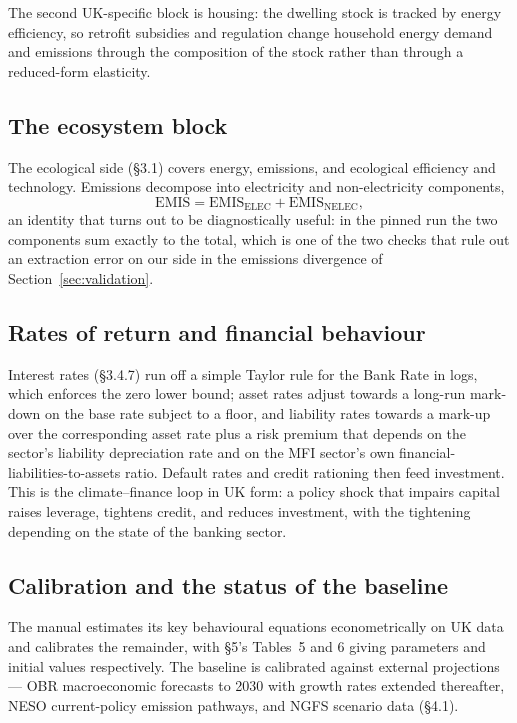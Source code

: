 The second UK-specific block is housing: the dwelling stock is tracked by energy efficiency, so retrofit subsidies and regulation change household energy demand and emissions through the composition of the stock rather than through a reduced-form elasticity.

\subsection{The ecosystem block}

The ecological side (\S3.1) covers energy, emissions, and ecological efficiency and technology. Emissions decompose into electricity and non-electricity components,
\begin{equation}
\mathrm{EMIS} = \mathrm{EMIS}_{\mathrm{ELEC}} + \mathrm{EMIS}_{\mathrm{NELEC}},
\label{eq:emis}
\end{equation}
an identity that turns out to be diagnostically useful: in the pinned run the two components sum exactly to the total, which is one of the two checks that rule out an extraction error on our side in the emissions divergence of Section~\ref{sec:validation}.

\subsection{Rates of return and financial behaviour}

Interest rates (\S3.4.7) run off a simple Taylor rule for the Bank Rate in logs, which enforces the zero lower bound; asset rates adjust towards a long-run mark-down on the base rate subject to a floor, and liability rates towards a mark-up over the corresponding asset rate plus a risk premium that depends on the sector's liability depreciation rate and on the MFI sector's own financial-liabilities-to-assets ratio. Default rates and credit rationing then feed investment. This is the \citet{dafermos2018} climate--finance loop in UK form: a policy shock that impairs capital raises leverage, tightens credit, and reduces investment, with the tightening depending on the state of the banking sector.

\subsection{Calibration and the status of the baseline}

The manual estimates its key behavioural equations econometrically on UK data and calibrates the remainder, with \S5's Tables~5 and 6 giving parameters and initial values respectively. The baseline is calibrated against external projections --- OBR macroeconomic forecasts to 2030 with growth rates extended thereafter, NESO current-policy emission pathways, and NGFS scenario data (\S4.1).

